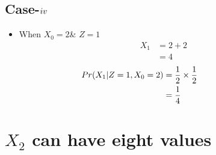 \documentclass[11pt,a4paper,twocolumn]{article}
\begin{document}
         \subsection{Case-$\romannumeral4$}
         \begin{itemize}
             \item  When $X_{0}=2$\& $Z=1$
             \begin{align*}
         X_{1}&=2+2\\
         &=4
         \end{align*}
         \begin{align*}
        \hspace{-2cm}
          Pr(X_{1}|Z=1,X_{0}=2)&=\frac{1}{2}\times\frac{1}{2}\\
        &=\frac{1}{4}
        \end{align*}
         \end{itemize}
    \section{$X_{2}$ can have eight values}
    \hspace{3cm}
\end{document}
